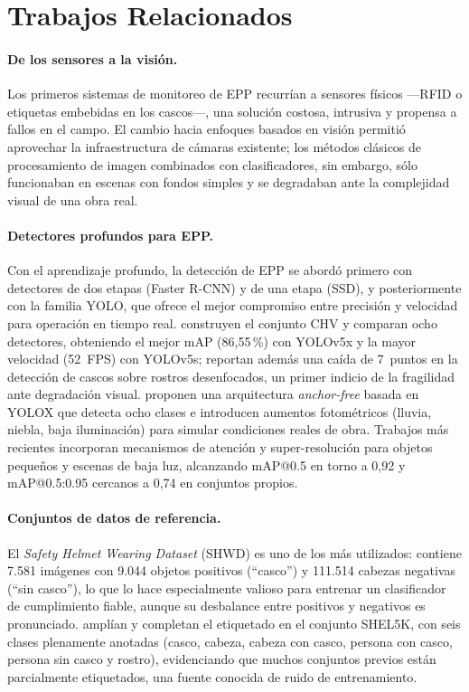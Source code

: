\documentclass{article}
\begin{document}
\section{Trabajos Relacionados}

\paragraph{De los sensores a la visión.} Los primeros sistemas de monitoreo de
EPP recurrían a sensores físicos —RFID o etiquetas embebidas en los cascos—,
una solución costosa, intrusiva y propensa a fallos en el campo. El cambio
hacia enfoques basados en visión permitió aprovechar la infraestructura de
cámaras existente; los métodos clásicos de procesamiento de imagen combinados
con clasificadores, sin embargo, sólo funcionaban en escenas con fondos
simples y se degradaban ante la complejidad visual de una obra real.

\paragraph{Detectores profundos para EPP.} Con el aprendizaje profundo, la
detección de EPP se abordó primero con detectores de dos etapas (Faster
R-CNN) y de una etapa (SSD), y posteriormente con la familia YOLO, que ofrece
el mejor compromiso entre precisión y velocidad para operación en tiempo real.
\citet{wang2021fast} construyen el conjunto CHV y comparan ocho detectores,
obteniendo el mejor mAP (86{,}55\,\%) con YOLOv5x y la mayor velocidad
(52~FPS) con YOLOv5s; reportan además una caída de 7~puntos en la detección de
cascos sobre rostros desenfocados, un primer indicio de la fragilidad ante
degradación visual. \citet{ferdous2022ppe} proponen una arquitectura
\emph{anchor-free} basada en YOLOX que detecta ocho clases e introducen
aumentos fotométricos (lluvia, niebla, baja iluminación) para simular
condiciones reales de obra. Trabajos más recientes incorporan mecanismos de
atención y super-resolución para objetos pequeños y escenas de baja luz,
alcanzando mAP@0.5 en torno a 0{,}92 y mAP@0.5:0.95 cercanos a 0{,}74 en
conjuntos propios.

\paragraph{Conjuntos de datos de referencia.} El \emph{Safety Helmet Wearing
Dataset} (SHWD) \citep{shwd2019} es uno de los más utilizados: contiene 7.581
imágenes con 9.044 objetos positivos (``casco'') y 111.514 cabezas negativas
(``sin casco''), lo que lo hace especialmente valioso para entrenar un
clasificador de cumplimiento fiable, aunque su desbalance entre positivos y
negativos es pronunciado. \citet{otgonbold2022shel5k} amplían y completan el
etiquetado en el conjunto SHEL5K, con seis clases plenamente anotadas
(casco, cabeza, cabeza con casco, persona con casco, persona sin casco y
rostro), evidenciando que muchos conjuntos previos están parcialmente
etiquetados, una fuente conocida de ruido de entrenamiento.
\end{document}
